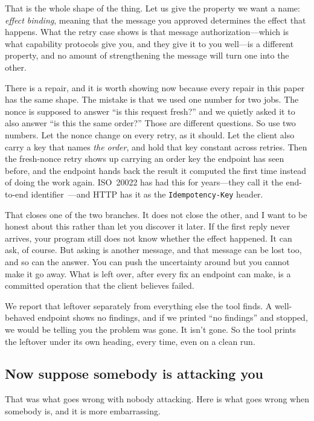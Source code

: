 \documentclass[11pt]{article}
\begin{document}
That is the whole shape of the thing. Let us give the property we want a name:
\emph{effect binding}, meaning that the message you approved determines the
effect that happens. What the retry case shows is that message
authorization---which is what capability protocols give you, and they give it
to you well---is a different property, and no amount of strengthening the
message will turn one into the other.

There is a repair, and it is worth showing now because every repair in this
paper has the same shape. The mistake is that we used one number for two jobs.
The nonce is supposed to answer ``is this request fresh?'' and we quietly
asked it to also answer ``is this the same order?'' Those are different
questions. So use two numbers. Let the nonce change on every retry, as it
should. Let the client also carry a key that names \emph{the order}, and hold
that key constant across retries. Then the fresh-nonce retry shows up carrying
an order key the endpoint has seen before, and the endpoint hands back the
result it computed the first time instead of doing the work again. ISO~20022
has had this for years---they call it the end-to-end
identifier~\cite{iso20022}---and HTTP has it as the
\texttt{Idempotency-Key} header.

That closes one of the two branches. It does not close the other, and I want
to be honest about this rather than let you discover it later. If the first
reply never arrives, your program still does not know whether the effect
happened. It can ask, of course. But asking is another message, and that
message can be lost too, and so can the answer. You can push the uncertainty
around but you cannot make it go away. What is left over, after every fix an
endpoint can make, is a committed operation that the client believes failed.

We report that leftover separately from everything else the tool finds. A
well-behaved endpoint shows no findings, and if we printed ``no findings'' and
stopped, we would be telling you the problem was gone. It isn't gone. So the
tool prints the leftover under its own heading, every time, even on a clean
run.

\subsection{Now suppose somebody is attacking you}

That was what goes wrong with nobody attacking. Here is what goes wrong when
somebody is, and it is more embarrassing.
\end{document}
